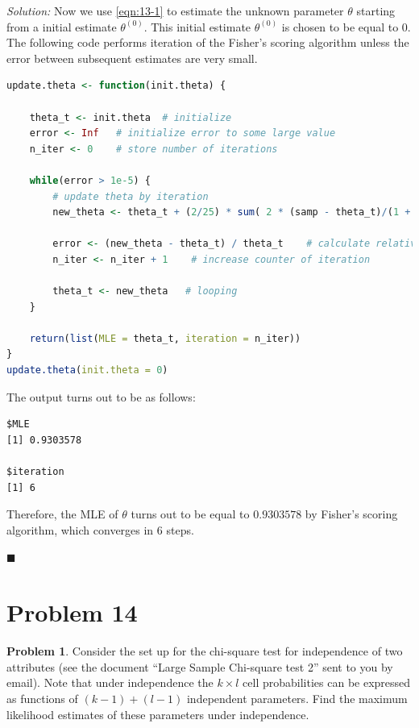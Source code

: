 \documentclass[12pt]{article}
\theoremstyle{definition}
\newtheorem*{prb}{Problem}
\newenvironment{problem}{\begin{tcolorbox}[colback=blue!5!white,colframe=blue!75!black, parbox = true] \begin{prb}  }{\end{prb}\end{tcolorbox} }
\newenvironment{answer}{\textit{Solution: }\quad }{ \hfill $\blacksquare$}
\numberwithin{equation}{section}
\begin{document}
\begin{answer}
    Now we use \cref{eqn:13-1} to estimate the unknown parameter $\theta$ starting from a initial estimate $\theta^{(0)}$. This initial estimate $\theta^{(0)}$ is chosen to be equal to 0. The following code performs iteration of the Fisher's scoring algorithm unless the error between subsequent estimates are very small.

\begin{lstlisting}[language = R]
update.theta <- function(init.theta) {

    theta_t <- init.theta  # initialize
    error <- Inf   # initialize error to some large value
    n_iter <- 0    # store number of iterations
    
    while(error > 1e-5) {
        # update theta by iteration
        new_theta <- theta_t + (2/25) * sum( 2 * (samp - theta_t)/(1 + (samp - theta_t)^2 ) )
        
        error <- (new_theta - theta_t) / theta_t    # calculate relative error
        n_iter <- n_iter + 1    # increase counter of iteration
        
        theta_t <- new_theta   # looping
    }
    
    return(list(MLE = theta_t, iteration = n_iter))
} 
update.theta(init.theta = 0)  
\end{lstlisting}

The output turns out to be as follows:

\begin{lstlisting}
$MLE
[1] 0.9303578

$iteration
[1] 6    
\end{lstlisting}

    Therefore, the MLE of $\theta$ turns out to be equal to $0.9303578$ by Fisher's scoring algorithm, which converges in $6$ steps.

\end{answer}


\pagebreak
\section{Problem 14}

\begin{problem}
Consider the set up for the chi-square test for independence of two attributes (see the document ``Large Sample Chi-square test 2” sent to you by email). Note that under independence the $k \times l$ cell probabilities can be expressed as functions of $(k-1) + (l-1)$ independent parameters. Find the maximum likelihood estimates of these parameters under independence.
\end{problem}
\end{document}
